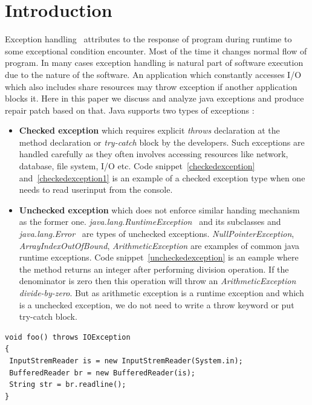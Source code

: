

\chapter{Introduction}
\label{chapter:introduction}

Exception handling~\cite{JavaException} attributes to the response of program during runtime to some
exceptional condition encounter. Most of the time it changes normal flow of
program. In many cases exception handling is natural part of software execution
due to the nature of the software.
An application which constantly accesses I/O which also includes share resources
may throw exception if another application blocks it.
Here in this paper we discuss and analyze java exceptions and produce repair
patch based on that. Java supports two types of exceptions :

\begin{itemize}
  
  \item \textbf{Checked exception} which requires explicit \emph{throws}
  declaration at the method declaration or \emph{try-catch} block by the
  developers. Such exceptions are handled carefully as they often involves
  accessing resources like network, database, file system, I/O etc.
  Code snippet~\ref{checkedexception} and~\ref{checkedexception1} is an example of a
  checked exception type when one needs to read userinput from the console.
  
  \item \textbf{Unchecked exception} which does not enforce similar handing
  mechanism as the former one.
  \emph{java.lang.RuntimeException}~\cite{RuntimeException} and its subclasses
  and \emph{java.lang.Error}~\cite{JavaError} are types of unchecked exceptions.
  \emph{NullPointerException}, \emph{ArrayIndexOutOfBound},
  \emph{ArithmeticException} are examples of common java runtime exceptions.
  Code snippet~\ref{uncheckedexception} is an eample where the method returns an
  integer after performing division operation. If the denominator is zero then
  this operation will throw an \emph{ArithmeticException} \emph{divide-by-zero}.
  But as arithmetic exception is a runtime exception and which is a unchecked
  exception, we do not need to write a throw keyword or put try-catch block.
  
\end{itemize}

\onehalfspacing
\lstset{language=Java, caption=Example 1 of java checked exception,
label=checkedexception}
\begin{lstlisting}
void foo() throws IOException
{
 InputStremReader is = new InputStremReader(System.in);
 BufferedReader br = new BufferedReader(is);
 String str = br.readline();
}
\end{lstlisting}


